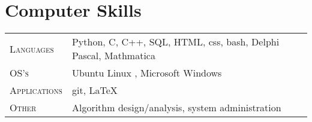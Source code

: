 
\section{Computer Skills}

\begin{tabular}{R{2.5cm}|l}
\textsc{Languages}         & Python, C,  C++, SQL, HTML, css, bash, Delphi Pascal, Mathmatica \\
\textsc{OS's} & Ubuntu Linux , Microsoft Windows\\
\textsc{Applications}      & git, \LaTeX \\
\textsc{Other}             & Algorithm design/analysis, system administration
\end{tabular}

